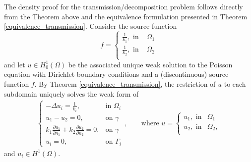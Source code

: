 The density proof for the transmission/decomposition problem follows directly from the Theorem above and the equivalence formulation presented in Theorem \ref{equivalence_transmission}. Consider the source function
\begin{equation}
    f = \begin{cases}
        \frac{1}{k_1}, \text{ in } & \Omega_1\\
        \frac{1}{k_2}, \text{ in } & \Omega_2\\
    \end{cases}
\end{equation}
and let \(u \in H^1_0(\Omega)\) be the associated unique weak solution to the Poisson equation with Dirichlet boundary conditions and a (discontinuous) source function \(f\). By Theorem \ref{equivalence_transmission}, the restriction of \(u\) to each subdomain uniquely solves the weak form of
\begin{align}\label{transmission_restriction_equations_density}
    \begin{cases}
    - \Delta u_i = \frac{1}{k_i}, & \text{in }\Omega_i\\
    u_1 - u_2 = 0, & \text{on }\gamma\\
    k_1 \frac{\partial u_1}{\partial n_1} + k_2 \frac{\partial u_2}{\partial n_2} = 0, & \text{on }\gamma\\
    u_i = 0, & \text{on }\Gamma_i
    \end{cases}
    ,\qquad
    \text{where } 
    u = \begin{cases}
        u_1, \text{ in} & \Omega_1\\
        u_2, \text{ in} & \Omega_2,\\
    \end{cases}
\end{align}
and \(u_i \in H^1(\Omega)\).

